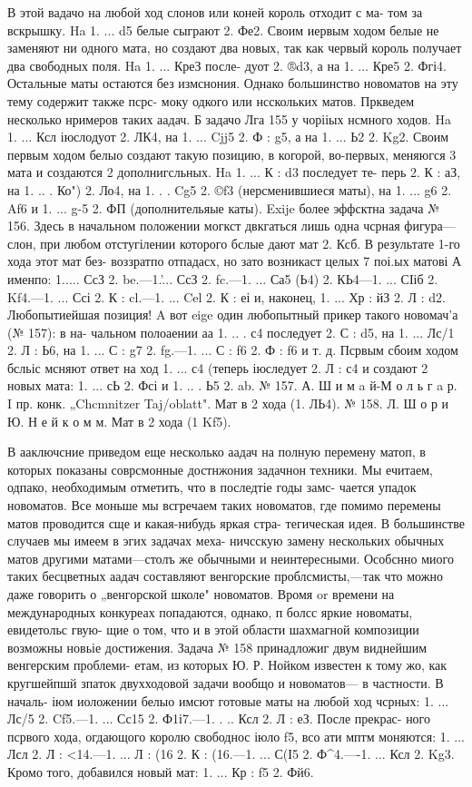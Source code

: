 {{    В этой вадачо на любой ход слонов или коней король отходит с ма- том за вскрышку. Ha 1. ... d5 белые сыграют 2. Фе2. Своим иервым ходом белые не заменяют ни одного мата, но создают два новых, так как червый король получает два свободных поля. Ha 1. ... КреЗ после- дуот 2. ®d3, а на 1. ... Кре5 2. Фгі4. Остальные маты остаются без измснония.
    Однако большинство новоматов на эту тему содержит также псрс- моку одкого или нсскольких матов. Пркведем несколько нримеров таких аадач.
    Б задачо Лга 155 у чорііых нсмного ходов. Ha 1. ... Ксл іюслодуот
2. ЛК4, на 1. ... Cjj5 2. Ф : g5, а на 1. ... Ь2 2. Kg2. Своим первым ходом белыо создают такую позицию, в когорой, во-первых, меняюгся 3 мата и создаются 2 дополнигсльных. Ha 1. ... К : d3 последует те- перь 2. К : аЗ, на 1. .. . Ко") 2. Ло4, на 1. . . Cg5 2. ©f3 (нерсменившиеся маты), на 1. ... g6 2. Af6 и 1. ... g-5 2. ФП (дополнительяые каты).
    Exije более эффсктна задача № 156. Здесь в начальном положении могкст двкгаться лишь одна чсрная фигура—слон, при любом отстугілении которого бслые дают мат 2. Ксб. В результате 1-го хода этот мат без- воззратпо отпадасх, но зато возникаст целых 7 поі.ых матові А именпо: 1..... СсЗ 2. be.—1.'... СсЗ 2. fc.—1. ... Са5 (Ь4) 2. КЬ4—1. ... СІіб
2. Kf4.—1. ... Ссі 2. К : cl.—1. ... Cel 2. К : еі и, наконец, 1. ... Хр : йЗ 2. Л : d2. Любопытиейшая позиция!
    A вот eige один любопытный прикер такого новомач’а (№ 157): в на- чальном полоаении аа 1. .. . с4 последует 2. С : d5, на 1. ... Лс/1
2. Л : Ь6, на 1. ... С : g7 2. fg.—1. ... С : f6 2. Ф : f6 и т. д. Псрвым сбоим ходом бсльіс мсняют ответ на ход 1. ... с4 (теперь іюследует
2. Л : с4 и создают 2 новых мата: 1. ... сЬ 2. Фсі и 1. .. . Ь5 2. ab.
№ 157. А. Ш и м a й-М о л ь г a р.
I пр. конк. „Chcmnitzer Taj/oblatt". 
Мат в 2 хода (1. ЛЬ4).
	№ 158. Л. Ш о р и Ю. Н е й к о м м.
Мат в 2 хода (1 Kf5).

    В ааключсние приведом еще несколько аадач на полную перемену матоп, в которых показаны соврсмонные достнжония задачнон техники. Мы ечитаем, одпако, необходимым отметить, что в последтіе годы замс- чается упадок новоматов. Все моньше мы всгречаем таких новоматов, где помимо перемены матов проводится сще и какая-нибудь яркая стра- тегическая идея. В большинстве случаев мы имеем в эгих задачах меха- ничсскую замену нескольких обычных матов другими матами—столъ же обычными и неинтересными. Особснно миого таких бесцветных аадач составляют венгорские проблсмисты,—так что можно даже говорить
о	„венгорской школе" новоматов. Вромя or времени на международных конкуреах попадаются, однако, п болсс яркие новоматы, евидетольс гвую- щие о том, что и в этой области шахмагной композиции возможны новьіе достижения.
    Задача № 158 принадложиг двум виднейшим венгерским проблеми- етам, из которых Ю. Р. Нойком известен к тому жо, как кругшейпшй зпаток двухходовой задачи вообщо и новоматов— в частности. В началь- іюм иоложении белыо имсют готовые маты на любой ход чсрных: 1. ... Лс/5 2. Cf5.—1. ... Сс15 2. Ф1і7.—1. . .. Ксл 2. Л : еЗ. После прекрас- ного псрвого хода, огдающого королю свободнос іюло f5, всо ати мптм моняются: 1. ... Лсл 2. Л : <14.—1. ... Л : (16 2. К : (16.—1. ... С(І5
2. Ф^4.—-1. ... Ксл 2. Kg3. Кромо того, добавился новый мат: 1. ... Кр : f5 2. Фй6.

}}
